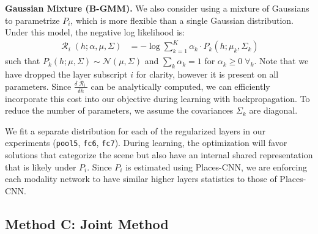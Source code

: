 \documentclass[10pt,journal,compsoc]{IEEEtran}
\DeclareMathOperator{\cR}{\mathcal{R}}
\begin{document}
    \textbf{Gaussian Mixture (B-GMM).} We also consider using a mixture of Gaussians to parametrize $P_i$, which is more flexible than a single Gaussian distribution. Under this model, the negative log likelihood is:
    \begin{align}
      \cR_i(h; \alpha, \mu, \Sigma) &= -\log \sum_{k=1}^K \alpha_{k} \cdot P_k(h; \mu_{k}, \Sigma_{k})
    \end{align}
    such that $P_k(h; \mu, \Sigma) \sim \mathcal{N}(\mu, \Sigma)$ and $\sum_k \alpha_k = 1$ for $\alpha_k \ge 0 \; \forall_k$. Note that we have dropped the layer subscript $i$ for clarity, however it is present on all parameters. Since $\frac{\delta \cR_i}{\delta h}$ can be analytically computed, we can efficiently incorporate this cost into our objective during learning with backpropagation. To reduce the number of parameters, we assume the covariances $\Sigma_k$ are diagonal. 
    
    
    We fit a separate distribution for each of the regularized layers in our experiments (\texttt{pool5}, \texttt{fc6}, \texttt{fc7}). During learning, the optimization will favor solutions that categorize the scene but also have an internal shared representation that is likely under $P_i$. Since $P_i$ is estimated using Places-CNN, we are enforcing each modality network to have similar higher layers statistics to those of Places-CNN.
    

    \subsection{Method C: Joint Method} 
\end{document}

